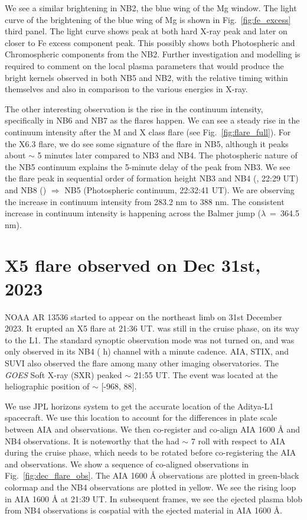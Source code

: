 We see a similar brightening in NB2, the blue wing of the Mg window. The light curve of the brightening of the blue wing of Mg is shown in Fig.~\ref{fig:fe_excess} third panel. The light curve shows peak at both hard X-ray peak and later on closer to Fe excess component peak. This possibly shows both Photospheric and Chromospheric components from the NB2. Further investigation and modelling is required to comment on the local plasma parameters that would produce the bright kernels observed in both NB5 and NB2, with the relative timing within themselves and also in comparison to the various energies in X-ray.

The other interesting observation is the rise in the continuum intensity, specifically in NB6 and NB7 as the flares happen. We can see a steady rise in the continuum intensity after the M and X class flare (see Fig.~\ref{fig:flare_full}). For the X6.3 flare, we do see some signature of the flare in NB5, although it peaks about $\sim$ 5 minutes later compared to NB3 and NB4. The photospheric nature of the NB5 continuum explains the 5-minute delay of the peak from NB3. We see the flare peak in sequential order of formation height NB3 and NB4 (, 22:29 UT) and NB8 () $\Longrightarrow$ NB5 (Photospheric continuum, 22:32:41 UT). We are observing the increase in continuum intensity from 283.2 nm to 388 nm. The consistent increase in continuum intensity is happening across the Balmer jump ($\lambda$~=~364.5 nm).

\section{X5 flare observed on Dec 31st, 2023} \label{sec:dec_31st}

NOAA AR 13536 started to appear on the northeast limb on 31st December 2023. It erupted an X5 flare at 21:36 UT. {\suit} was still in the cruise phase, on its way to the L1. The standard synoptic observation mode was not turned on, and {\suit} was only observed in its NB4 ( h) channel with a minute cadence. AIA, STIX, and SUVI also observed the flare among many other imaging observatories. The {\it GOES} Soft X-ray (SXR) peaked $\sim$ 21:55 UT. The event was located at the heliographic position of $\sim$ [-968{\arcsec}, 88{\arcsec}].

We use JPL horizons system to get the accurate location of the Aditya-L1 spacecraft. We use this location to account for the differences in plate scale between AIA and {\suit} observations. We then co-register and co-align AIA 1600 {\AA} and {\suit} NB4 observations. It is noteworthy that the {\suit} had $\sim$ 7{\degree} roll with respect to AIA during the cruise phase, which needs to be rotated before co-registering the AIA and {\suit} observations. We show a sequence of co-aligned observations in Fig.~\ref{fig:dec_flare_obs}. The AIA 1600 {\AA} observations are plotted in green-black colormap and the {\suit} NB4 observations are plotted in yellow. We see the rising loop in AIA 1600 {\AA} at 21:39 UT. In subsequent frames, we see the ejected plasma blob from NB4 observations is cospatial with the ejected material in AIA 1600 {\AA}.

